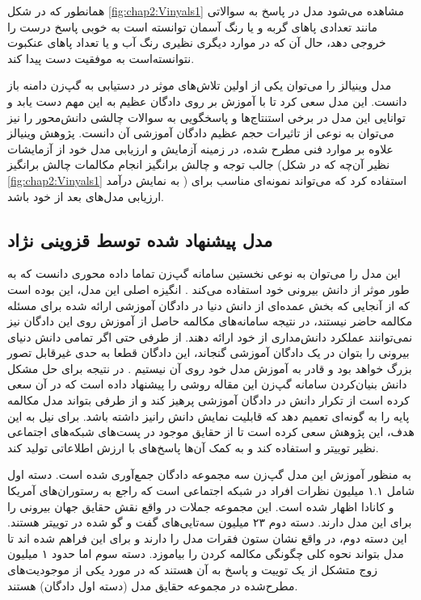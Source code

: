 همانطور که در شکل
\ref{fig:chap2:Vinyals1}
مشاهده‌ می‌شود مدل در پاسخ به سوالاتی مانند تعدادی پا‌های گربه و یا رنگ آسمان توانسته‌ است به خوبی پاسخ درست را خروجی دهد، حال آن که در موارد دیگری نظیری رنگ آب و یا تعداد پاهای عنکبوت نتوانسته‌است به موفقیت دست پیدا کند.

مدل وینیالز را می‌توان یکی از اولین تلاش‌های موثر در دستیابی به گپ‌زن دامنه باز دانست. این مدل سعی کرد تا با آموزش بر روی دادگان عظیم 
به این مهم دست یابد و توانایی این مدل در برخی استنتاج‌‌ها و پاسخگویی به سوالات چالشی دانش‌محور را نیز می‌توان به نوعی از تاثیرات حجم عظیم دادگان‌ آموزشی آن دانست.
\cite{Tiedemann2009NewsFO}
 پژوهش وینیالز علاوه بر موارد فنی مطرح شده، در زمینه آزمایش و ارزیابی مدل خود از آزمایشات جالب توجه و چالش بر‌انگیز  انجام مکالمات چالش برانگیز 
(نظیر آن‌چه که در شکل 
\ref{fig:chap2:Vinyals1}
به نمایش درآمد
)
استفاده کرد که می‌تواند نمونه‌ای‌ مناسب برای ارزیابی مدل‌های بعد از خود باشد. 

\subsection{مدل پیشنهاد شده توسط قزوینی نژاد}
این مدل را می‌توان به نوعی نخستین سامانه گپ‌زن تماما داده محوری دانست که به طور موثر از دانش بیرونی خود استفاده می‌کند
\cite{a_knowledge_grounded}.
انگیزه اصلی این مدل، این بوده است که از آنجایی که بخش عمده‌ای از دانش دنیا در دادگان آموزشی ارائه شده برای مسئله مکالمه حاضر نیستند، در نتیجه سامانه‌های مکالمه حاصل از آموزش روی این دادگان نیز نمی‌توانند عملکرد دانش‌مداری از خود ارائه دهند. از طرفی حتی اگر تمامی دانش دنیای بیرونی را بتوان در یک دادگان آموزشی گنجاند، این دادگان قطعا به حدی غیرقابل تصور بزرگ خواهد بود و قادر به آموزش مدل خود روی آن نیستیم
\cite{a_knowledge_grounded}.
در نتیجه برای حل مشکل دانش بنیان‌کردن سامانه‌ گپ‌زن این مقاله روشی را پیشنهاد داده است که در آن سعی کرده است از تکرار دانش در دادگان آموزشی پرهیز کند و از طرفی بتواند مدل مکالمه پایه را به گونه‌ای تعمیم دهد که قابلیت نمایش دانش رانیز داشته باشد. برای نیل به این هدف، این پژوهش سعی کرده است تا از حقایق موجود در پست‌های شبکه‌های اجتماعی نظیر توییتر و 
استفاده کند و به کمک آن‌ها پاسخ‌های با ارزش اطلاعاتی تولید کند.

به منظور آموزش این مدل گپ‌زن سه مجموعه دادگان جمع‌آوری شده است. دسته اول شامل ۱.۱ میلیون نظرات افراد در شبکه اجتماعی 
است که راجع به رستوران‌های آمریکا و کانادا اظهار شده است. این مجموعه جملات در واقع نقش حقایق جهان بیرونی را برای این مدل دارند. دسته دوم ۲۳ میلیون سه‌تایی‌های گفت و گو شده در
توییتر
هستند. این دسته دوم، در واقع نشان ستون فقرات مدل را دارند و برای این فراهم شده اند تا مدل بتواند نحوه کلی چگونگی مکالمه کردن را بیاموزد.
دسته سوم اما حدود ۱ میلیون زوج متشکل از یک توییت و پاسخ به آن هستند که  در مورد یکی از موجودیت‌های مطرح‌شده در مجموعه حقایق مدل (دسته اول دادگان) هستند.

